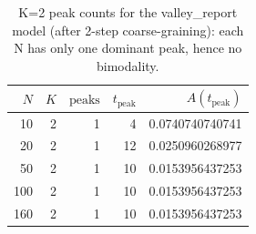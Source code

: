 \begin{table}[!htbp]
\centering
\begin{tabular}{rrrrr}
\toprule
$N$ & $K$ & $\mathrm{peaks}$ & $t_{\mathrm{peak}}$ & $A(t_{\mathrm{peak}})$\\
\midrule
10 & 2 & 1 & 4 & 0.0740740740741\\
20 & 2 & 1 & 12 & 0.0250960268977\\
50 & 2 & 1 & 10 & 0.0153956437253\\
100 & 2 & 1 & 10 & 0.0153956437253\\
160 & 2 & 1 & 10 & 0.0153956437253\\
\bottomrule
\end{tabular}
\caption{K=2 peak counts for the valley\_report model (after 2-step coarse-graining): each N has only one dominant peak, hence no bimodality.}
\label{tab:valley-report-k2-en}
\end{table}
